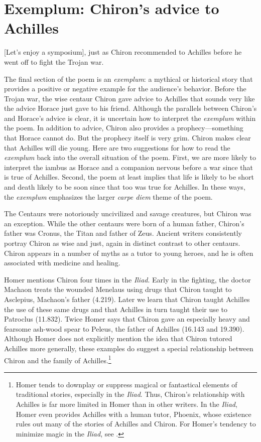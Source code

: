 
\section*{Exemplum: Chiron's advice to Achilles}

[Let's enjoy a symposium], just as Chiron recommended to Achilles before he went off to fight the Trojan war.

The final section of the poem is an \textit{exemplum}: a mythical or historical story that provides a positive or negative example for the audience's behavior.  Before the Trojan war, the wise centaur Chiron gave advice to Achilles that sounds very like the advice Horace just gave to his friend.  Although the parallels between Chiron's and Horace's advice is clear, it is uncertain how to interpret the \textit{exemplum} within the poem.  In addition to advice, Chiron also provides a prophecy---something that Horace cannot do.  But the prophecy itself is very grim.  Chiron makes clear that Achilles will die young.  Here are two suggestions for how to read the \textit{exemplum} back into the overall situation of the poem.  First, we are more likely to interpret the iambus as Horace and a companion nervous before a war since that is true of Achilles.  Second, the poem at least implies that life is likely to be short and death likely to be soon since that too was true for Achilles.  In these ways, the \textit{exemplum} emphasizes the larger \textit{carpe diem} theme of the poem.

The Centaurs were notoriously uncivilized and savage creatures, but Chiron was an exception.  While the other centaurs were born of a human father, Chiron's father was Cronus, the Titan and father of Zeus.  Ancient writers consistently portray Chiron as wise and just, again in distinct contrast to other centaurs.  Chiron appears in a number of myths as a tutor to young heroes, and he is often associated with medicine and healing.

Homer mentions Chiron four times in the \textit{Iliad}.  Early in the fighting, the doctor Machaon treats the wounded Menelaus using drugs that Chiron taught to Asclepius, Machaon's father (4.219).  Later we learn that Chiron taught Achilles the use of these same drugs and that Achilles in turn taught their use to Patroclus (11.832).  Twice Homer says that Chiron gave an especially heavy and fearsome ash-wood spear to Peleus, the father of Achilles (16.143 and 19.390).  Although Homer does not explicitly mention the idea that Chiron tutored Achilles more generally, these examples do suggest a special relationship between Chiron and the family of Achilles.\footnote{Homer tends to downplay or suppress magical or fantastical elements of traditional stories, especially in the \textit{Iliad}. Thus, Chiron's relationship with Achilles is far more limited in Homer than in other writers.  In the \textit{Iliad}, Homer even provides Achilles with a human tutor, Phoenix, whose existence rules out many of the stories of Achilles and Chiron.  For Homer's tendency to minimize magic in the \textit{Iliad}, see \citet[165 ff.]{griffin1983}.}

